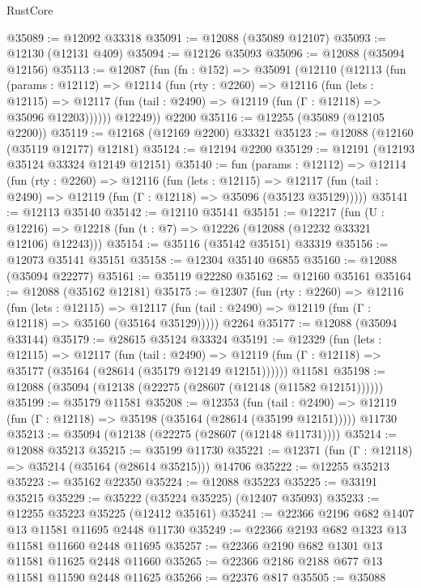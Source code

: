 \begin{lexlean}{RustCore}
\begin{coremodule}
@35089 := @12092 @33318
@35091 := @12088 (@35089 @12107)
@35093 := @12130 (@12131 @409)
@35094 := @12126 @35093
@35096 := @12088 (@35094 @12156)
@35113 := @12087
    (fun (fn : @152) =>
    @35091
      (@12110
        (@12113
          (fun (params : @12112) =>
          @12114
            (fun (rty : @2260) =>
            @12116
              (fun (lets : @12115) =>
              @12117 (fun (tail : @2490) => @12119 (fun (Γ : @12118) => @35096 @12203))))))
        @12249))
    @2200
@35116 := @12255 (@35089 (@12105 @2200))
@35119 := @12168 (@12169 @2200) @33321
@35123 := @12088 (@12160 (@35119 @12177) @12181)
@35124 := @12194 @2200
@35129 := @12191 (@12193 @35124 @33324 @12149 @12151)
@35140 := fun (params : @12112) =>
  @12114
    (fun (rty : @2260) =>
    @12116
      (fun (lets : @12115) =>
      @12117 (fun (tail : @2490) => @12119 (fun (Γ : @12118) => @35096 (@35123 @35129)))))
@35141 := @12113 @35140
@35142 := @12110 @35141
@35151 := @12217
    (fun (U : @12216) => @12218 (fun (t : @7) => @12226 (@12088 (@12232 @33321 @12106) @12243)))
@35154 := @35116 (@35142 @35151) @33319
@35156 := @12073 @35141 @35151
@35158 := @12304 @35140 @6855
@35160 := @12088 (@35094 @22277)
@35161 := @35119 @22280
@35162 := @12160 @35161
@35164 := @12088 (@35162 @12181)
@35175 := @12307
    (fun (rty : @2260) =>
    @12116
      (fun (lets : @12115) =>
      @12117 (fun (tail : @2490) => @12119 (fun (Γ : @12118) => @35160 (@35164 @35129)))))
    @2264
@35177 := @12088 (@35094 @33144)
@35179 := @28615 @35124 @33324
@35191 := @12329
    (fun (lets : @12115) =>
    @12117
      (fun (tail : @2490) =>
      @12119 (fun (Γ : @12118) => @35177 (@35164 (@28614 (@35179 @12149 @12151))))))
    @11581
@35198 := @12088 (@35094 (@12138 (@22275 (@28607 (@12148 (@11582 @12151))))))
@35199 := @35179 @11581
@35208 := @12353
    (fun (tail : @2490) => @12119 (fun (Γ : @12118) => @35198 (@35164 (@28614 (@35199 @12151)))))
    @11730
@35213 := @35094 (@12138 (@22275 (@28607 (@12148 @11731))))
@35214 := @12088 @35213
@35215 := @35199 @11730
@35221 := @12371 (fun (Γ : @12118) => @35214 (@35164 (@28614 @35215))) @14706
@35222 := @12255 @35213
@35223 := @35162 @22350
@35224 := @12088 @35223
@35225 := @33191 @35215
@35229 := @35222 (@35224 @35225) (@12407 @35093)
@35233 := @12255 @35223 @35225 (@12412 @35161)
@35241 := @22366 @2196 @682 @1407 @13 @11581 @11695 @2448 @11730
@35249 := @22366 @2193 @682 @1323 @13 @11581 @11660 @2448 @11695
@35257 := @22366 @2190 @682 @1301 @13 @11581 @11625 @2448 @11660
@35265 := @22366 @2186 @2188 @677 @13 @11581 @11590 @2448 @11625
@35266 := @22376 @817
@35505 := @35088

\end{coremodule}
\end{lexlean}
